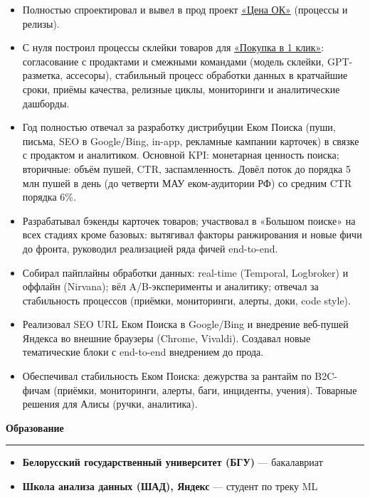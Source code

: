 \documentclass[11pt, a4paper]{article}
\newcommand{\sectionresume}[1]{\vspace{0.6em}\textbf{\large #1}\vspace{0.3em}\hrule\vspace{0.4em}}
\begin{document}
\begin{itemize}[nosep, leftmargin=*]
  \item Полностью спроектировал и вывел в прод проект \href{https://www.cnews.ru/news/line/2025-10-14_yandeks_vnedril_ok-tsenu}{«Цена ОК»} (процессы и релизы).
  \item С нуля построил процессы склейки товаров для \href{https://yandex.ru/support/search/ru/quick-purchase}{«Покупка в 1 клик»}: согласование с продактами и смежными командами (модель склейки, GPT-разметка, ассесоры), стабильный процесс обработки данных в кратчайшие сроки, приёмы качества, релизные циклы, мониторинги и аналитические дашборды.
  \item Год полностью отвечал за разработку дистрибуции Еком Поиска (пуши, письма, SEO в Google/Bing, in-app, рекламные кампании карточек) в связке с продактом и аналитиком. Основной KPI: монетарная ценность поиска; вторичные: объём пушей, CTR, заспамленность. Довёл поток до порядка 5 млн пушей в день (до четверти МАУ еком-аудитории РФ) со средним CTR порядка 6\%.
  \item Разрабатывал бэкенды карточек товаров; участвовал в «Большом поиске» на всех стадиях кроме базовых: вытягивал факторы ранжирования и новые фичи до фронта, руководил реализацией ряда фичей end-to-end.
  \item Собирал пайплайны обработки данных: real-time (Temporal, Logbroker) и оффлайн (Nirvana); вёл A/B-эксперименты и аналитику; отвечал за стабильность процессов (приёмки, мониторинги, алерты, доки, code style).
  \item Реализовал SEO URL Еком Поиска в Google/Bing и внедрение веб-пушей Яндекса во внешние браузеры (Chrome, Vivaldi). Создавал новые тематические блоки с end-to-end внедрением до прода.
  \item Обеспечивал стабильность Еком Поиска: дежурства за рантайм по B2C-фичам (приёмки, мониторинги, алерты, баги, инциденты, учения). Товарные решения для Алисы (ручки, аналитика).
\end{itemize}
\vspace{3.2em}
\sectionresume{Образование}

\begin{itemize}[nosep, leftmargin=*]
  \item \textbf{Белорусский государственный университет (БГУ)} — бакалавриат
  \item \textbf{Школа анализа данных (ШАД), Яндекс} — студент по треку ML
\end{itemize}
\end{document}
